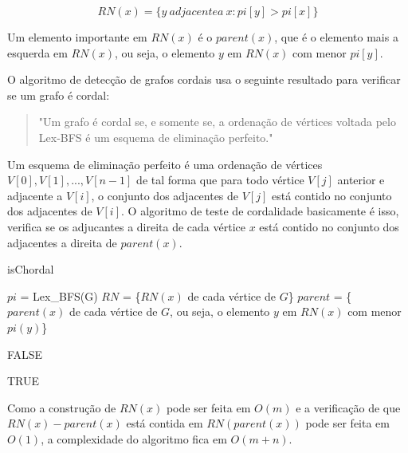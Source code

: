 \documentclass{article}
\begin{document}
\begin{equation}
    RN(x) = \{ y \  adjacente a \  x: pi[y] > pi[x] \}
\end{equation}

Um elemento importante em $RN(x)$ é o $parent(x)$, que é o elemento mais a
esquerda em $RN(x)$, ou seja, o elemento $y$ em $RN(x)$ com menor $pi[y]$.

O algoritmo de detecção de grafos cordais usa o seguinte resultado para
verificar se um grafo é cordal:

\begin{quotation}
"Um grafo é cordal se, e somente se, a ordenação de vértices voltada pelo
Lex-BFS é um esquema de eliminação perfeito."
\end{quotation}

Um esquema de eliminação perfeito é uma
ordenação de vértices $V[0],V[1], ... , V[n-1]$ de tal forma que para todo
vértice $V[j]$ anterior e adjacente a $V[i]$, o conjunto dos adjacentes de
$V[j]$ está contido no conjunto dos adjacentes de $V[i]$. O algoritmo de teste
de cordalidade basicamente é isso, verifica se os adjucantes a direita de cada
vértice $x$ está contido no conjunto dos adjacentes a direita de $parent(x)$.


\begin{algorithm}
    \caption{isChordal}
    \label{alg:ischordal}
    
    \begin{algorithmic}
    
        \STATE $pi$ = Lex\_BFS(G)\;
        \STATE $RN$ = \{$RN(x)$ de cada vértice de $G$\}\;
        \STATE $parent$ = \{$parent(x)$ de cada vértice de $G$, ou seja, o elemento $y$ em $RN(x)$ com menor $pi(y)$\}\;
       
                \RETURN FALSE\;
            \ENDIF
       \ENDFOR
       
       \RETURN TRUE
    
    \end{algorithmic}
\end{algorithm}



Como a construção de $RN(x)$ pode ser feita em $O(m)$ e a verificação de que
$RN(x)-parent(x)$ está contida em $RN(parent(x))$ pode ser feita em $O(1)$, a
complexidade do algoritmo fica em $O(m+n)$.








\printindex
\end{document}
